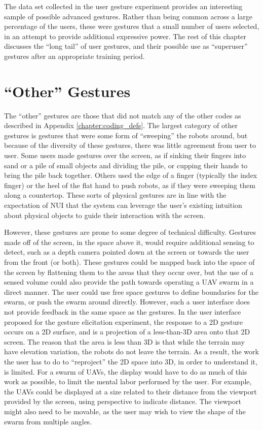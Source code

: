 The data set collected in the user gesture experiment provides an interesting sample of possible advanced gestures. 
Rather than being common across a large percentage of the users, these were gestures that a small number of users selected, in an attempt to provide additional expressive power. 
The rest of this chapter discusses the ``long tail'' of user gestures, and their possible use as ``superuser'' gestures after an appropriate training period. 

\section{``Other'' Gestures}

The ``other'' gestures are those that did not match any of the other codes as described in Appendix \ref{chapter:coding_defs}. 
The largest category of other gestures is gestures that were some form of ``sweeping'' the robots around, but because of the diversity of these gestures, there was little agreement from user to user. 
Some users made gestures over the screen, as if sinking their fingers into sand or a pile of small objects and dividing the pile, or cupping their hands to bring the pile back together. 
Others used the edge of a finger (typically the index finger) or the heel of the flat hand to push robots, as if they were sweeping them along a countertop. 
These sorts of physical gestures are in line with the expectation of NUI that the system can leverage the user's existing intuition about physical objects to guide their interaction with the screen. 

However, these gestures are prone to some degree of technical difficulty. 
Gestures made off of the screen, in the space above it, would require additional sensing to detect, such as a depth camera pointed down at the screen or towards the user from the front (or both). 
These gestures could be mapped back into the space of the screen by flattening them to the areas that they occur over, but the use of a sensed volume could also provide the path towards operating a UAV swarm in a direct manner. 
The user could use free space gestures to define boundaries for the swarm, or push the swarm around directly. 
However, such a user interface does not provide feedback in the same space as the gestures. 
In the user interface proposed for the gesture elicitation experiment, the response to a 2D gesture occurs on a 2D surface, and is a projection of a less-than-3D area onto that 2D screen.
The reason that the area is less than 3D is that while the terrain may have elevation variation, the robots do not leave the terrain. 
As a result, the work the user has to do to ``reproject'' the 2D space into 3D, in order to understand it, is limited. 
For a swarm of UAVs, the display would have to do as much of this work as possible, to limit the mental labor performed by the user. 
For example, the UAVs could be displayed at a size related to their distance from the viewport provided by the screen, using perspective to indicate distance. 
The viewport might also need to be movable, as the user may wish to view the shape of the swarm from multiple angles. 

